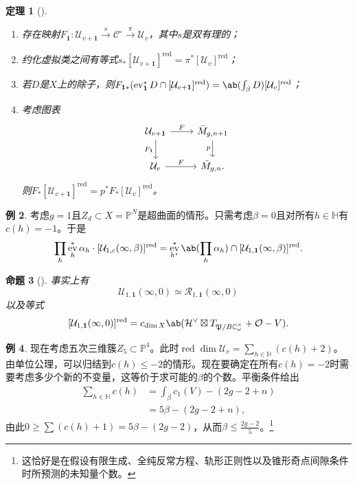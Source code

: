 \documentclass{amsart}
\newtheorem{thm}{定理}[section]
\newtheorem{prop}[thm]{命题}
\theoremstyle{definition}
\newtheorem{exm}[thm]{例}
\theoremstyle{remark}
\theoremstyle{plain}
\theoremstyle{definition}
\theoremstyle{remark}
\newcommand{\C}{\mathbb{C}}
\renewcommand{\H}{\mathbb{H}}
\renewcommand{\P}{\mathbb{P}}
\newcommand{\mc}[1]{\mathcal{#1}}
\newcommand{\mf}[1]{\mathfrak{#1}}
\newcommand{\mr}[1]{\mathrm{#1}}
\newcommand{\on}[1]{\operatorname{#1}}
\newcommand{\1}{\mathbf{1}}
\newcommand{\2}{\mathbf{2}}
\newcommand{\3}{\mathbf{3}}
\DeclareMathOperator{\ev}{ev}
\begin{document}
\begin{thm}[{\cite[定理~1.16--1.17]{CJRpunctured}}]\leavevmode
    \begin{enumerate}
        \item 存在映射\(F_{\1} \colon \mc{U}_{v+\1} \xrightarrow{s} \mc{C}^{\circ} \xrightarrow{\pi} \mc{U}_v\)，其中\(s\)是双有理的；
        \item 约化虚拟类之间有等式\(s_* [\mc{U}_{v+\1}]^{\on{red}} = \pi^* [\mc{U}_v]^{\on{red}}\)；
        \item 若\(D\)是\(X\)上的除子，则\(F_{\1 *} (\ev_{\1}^* D \cap [\mc{U}_{v+\1}]^{\on{red}}) = \ab(\int_{\beta} D) [\mc{U}_v]^{\on{red}}\)；
        \item 考虑图表
            \begin{equation*}
            \begin{tikzcd}
                \mc{U}_{v+\1} \ar{r}{F} \ar{d}[swap]{F_{\1}} & \bar{M}_{g,n+1} \ar{d}[swap]{p} \\
                \mc{U}_v \ar{r}{F} & \bar{M}_{g,n}.
            \end{tikzcd}
            \end{equation*}
            则\(F_* [\mc{U}_{v+\1}]^{\on{red}} = p^* F_* [\mc{U}_v]^{\on{red}}\)。
    \end{enumerate}
\end{thm}

\begin{exm}
    考虑\(g = 1\)且\(Z_d \subset X = \P^N\)是超曲面的情形。只需考虑\(\beta = 0\)且对所有\(h \in \H\)有\(c(h) = -1\)。于是
    \[ \prod_h \ev_h^* \alpha_h \cdot [\mc{U}_{1,c}(\infty,\beta)]^{\mr{red}} = \ev_{h^{\star}}^* \ab(\prod_h \alpha_h) \cap [\mc{U}_{1,\1}(\infty,\beta)]^{\on{red}}. \]
\end{exm}

\begin{prop}[{\cite{CJRpunctured}}]
    事实上有
    \[ \mc{U}_{1,\1}(\infty, 0) \simeq \mc{R}_{1,\1}(\infty, 0) \]
    以及等式
    \[ [\mc{U}_{1,\1}(\infty, 0)]^{\on{red}} = c_{\dim X} \ab(\mc{H}^{\vee} \boxtimes T_{\mf{P}/B\C_{\omega}^{\times}} + \mc{O} - V). \]
\end{prop}

\begin{exm}
    现在考虑五次三维簇\(Z_5 \subset \P^4\)。此时\(\on{red}\dim \mc{U}_v = \sum_{h \in \H} (c(h)+2)\)。由单位公理，可以归结到\(c(h) \leq -2\)的情形。现在要确定在所有\(c(h) = -2\)时需要考虑多少个新的不变量，这等价于求可能的\(\beta\)的个数。平衡条件给出
    \begin{align*}
        \sum_{h \in \H} c(h) &= \int_{\beta} c_1(V) - (2g-2+n) \\
        &= 5\beta - (2g-2+n),
    \end{align*}
    由此\(0 \geq \sum (c(h)+1) = 5\beta - (2g-2)\)，从而\(\beta \leq \frac{2g-2}{5}\)。\footnote{这恰好是在假设有限生成、全纯反常方程、轨形正则性以及锥形奇点间隙条件时所预测的未知量个数。}
\end{exm}
\end{document}

